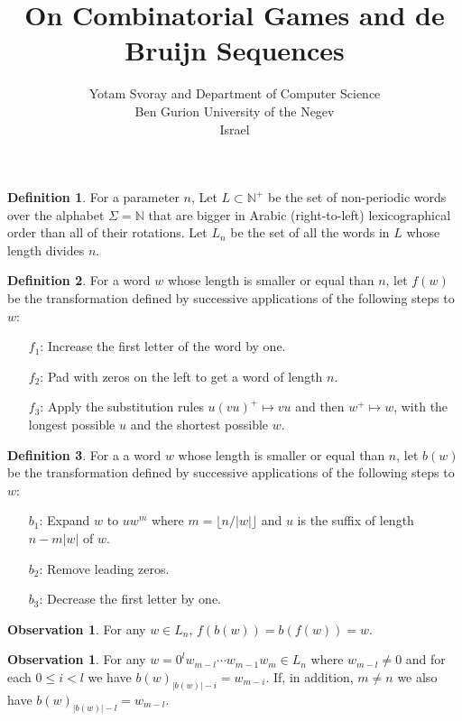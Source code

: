 \documentclass{article}
\title{On Combinatorial Games and de Bruijn Sequences}
\author{Yotam Svoray and %
	Department of Computer Science \\
	Ben Gurion University of the Negev\\
	Israel
}
\theoremstyle{definition}
\newtheorem{definition}{Definition}
\newtheorem{observation}[theorem]{Observation}
\newcommand{\N}{{\mathbb{N}}}
\begin{document}
	
	
	
\begin{definition}
For a parameter $n$, Let $L \subset \N^+$ be the set of non-periodic words over the alphabet $\Sigma=\N$ that are bigger in Arabic (right-to-left) lexicographical order than all of their rotations. Let $L_n$ be the set of all the words in $L$ whose length divides $n$.
\end{definition}

\begin{definition}\label{forward}
For a word $w$ whose length is smaller or equal than $n$, let  $f(w)$ be the transformation defined by successive applications of the following steps to $w$:
\begin{enumerate}
	\item[$f_1$:] Increase the first letter of the word by one. 
	\item[$f_2$:] Pad with zeros on the left to get a word of length $n$.
	\item[$f_3$:] Apply the substitution rules $u(vu)^+ \mapsto vu$ and then $w^+ \mapsto w$, with the longest possible $u$ and the shortest possible $w$.
\end{enumerate}
\end{definition}

\begin{definition}\label{backward}
For a a word $w$ whose length is smaller or equal than $n$, let  $b(w)$ be the transformation defined by successive applications of the following steps to $w$:
\begin{enumerate}
	\item[$b_1$:] Expand $w$ to $u w^m$ where $m=\lfloor n/ |w| \rfloor$ and $u$ is the suffix of length $n-m|w|$ of $w$.
	
	\item[$b_2$:] Remove leading zeros.
	\item[$b_3$:] Decrease the first letter by one.
\end{enumerate}
\end{definition}

\begin{observation}
	For any $w\in L_n$, $f(b(w))=b(f(w))=w$.
\end{observation}

\begin{observation}
	\label{tail-is-preserved}
	For any $w=0^lw_{m-l}\cdots w_{m-1} w_m \in L_n$ where $w_{m-l} \neq 0$ and for each $0 \leq i < l$ we have  $b(w)_{|b(w)|-i}=w_{m-i}$. If, in addition, $m \neq n$ we also have $b(w)_{|b(w)|-l} = w_{m-l}$.
\end{observation}
\end{document}
